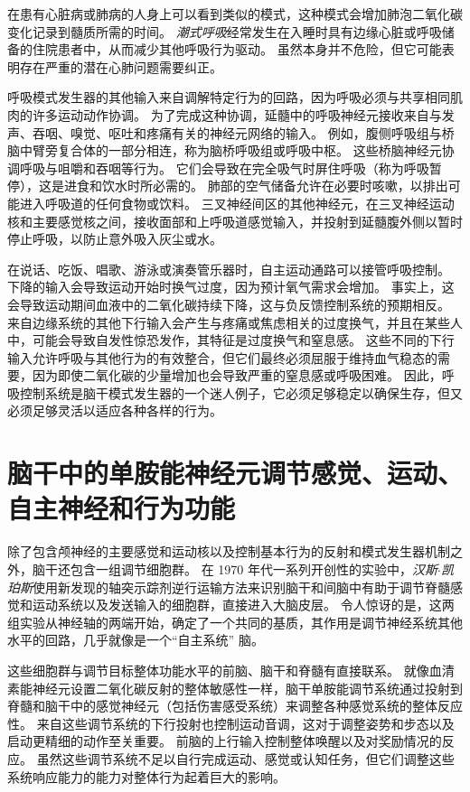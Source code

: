 在患有心脏病或肺病的人身上可以看到类似的模式，这种模式会增加肺泡二氧化碳变化记录到髓质所需的时间。
\textit{潮式呼吸}经常发生在入睡时具有边缘心脏或呼吸储备的住院患者中，从而减少其他呼吸行为驱动。
虽然本身并不危险，但它可能表明存在严重的潜在心肺问题需要纠正。


呼吸模式发生器的其他输入来自调解特定行为的回路，因为呼吸必须与共享相同肌肉的许多运动动作协调。
为了完成这种协调，延髓中的呼吸神经元接收来自与发声、吞咽、嗅觉、呕吐和疼痛有关的神经元网络的输入。
例如，腹侧呼吸组与桥脑中臂旁复合体的一部分相连，称为脑桥呼吸组或呼吸中枢。
这些桥脑神经元协调呼吸与咀嚼和吞咽等行为。
它们会导致在完全吸气时屏住呼吸（称为呼吸暂停），这是进食和饮水时所必需的。
肺部的空气储备允许在必要时咳嗽，以排出可能进入呼吸道的任何食物或饮料。
三叉神经间区的其他神经元，在三叉神经运动核和主要感觉核之间，接收面部和上呼吸道感觉输入，并投射到延髓腹外侧以暂时停止呼吸，以防止意外吸入灰尘或水。


在说话、吃饭、唱歌、游泳或演奏管乐器时，自主运动通路可以接管呼吸控制。
下降的输入会导致运动开始时换气过度，因为预计氧气需求会增加。
事实上，这会导致运动期间血液中的二氧化碳持续下降，这与负反馈控制系统的预期相反。
来自边缘系统的其他下行输入会产生与疼痛或焦虑相关的过度换气，并且在某些人中，可能会导致自发性惊恐发作，其特征是过度换气和窒息感。
这些不同的下行输入允许呼吸与其他行为的有效整合，但它们最终必须屈服于维持血气稳态的需要，因为即使二氧化碳的少量增加也会导致严重的窒息感或呼吸困难。
因此，呼吸控制系统是脑干模式发生器的一个迷人例子，它必须足够稳定以确保生存，但又必须足够灵活以适应各种各样的行为。



\section{脑干中的单胺能神经元调节感觉、运动、自主神经和行为功能}

除了包含颅神经的主要感觉和运动核以及控制基本行为的反射和模式发生器机制之外，脑干还包含一组调节细胞群。
在 1970 年代一系列开创性的实验中，\textit{汉斯$\cdot$凯珀斯}使用新发现的轴突示踪剂逆行运输方法来识别脑干和间脑中有助于调节脊髓感觉和运动系统以及发送输入的细胞群，直接进入大脑皮层。
令人惊讶的是，这两组实验从神经轴的两端开始，确定了一个共同的基质，其作用是调节神经系统其他水平的回路，几乎就像是一个“自主系统” 脑。


这些细胞群与调节目标整体功能水平的前脑、脑干和脊髓有直接联系。
就像血清素能神经元设置二氧化碳反射的整体敏感性一样，脑干单胺能调节系统通过投射到脊髓和脑干中的感觉神经元（包括伤害感受系统）来调整各种感觉系统的整体反应性。
来自这些调节系统的下行投射也控制运动音调，这对于调整姿势和步态以及启动更精细的动作至关重要。
前脑的上行输入控制整体唤醒以及对奖励情况的反应。
虽然这些调节系统不足以自行完成运动、感觉或认知任务，但它们调整这些系统响应能力的能力对整体行为起着巨大的影响。



